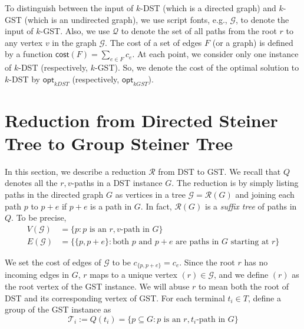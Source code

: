 \documentclass[11pt]{article}
\theoremstyle{definition}
\theoremstyle{remark}
\newcommand{\opt}{\mathsf{opt}}
\newcommand{\calG}{\mathcal{G}}
\newcommand{\calT}{\mathcal{T}}
\newcommand{\calQ}{\mathcal{Q}}
\newcommand{\calR}{\mathcal{R}}
\newcommand{\cost}{\mathsf{cost}}
\begin{document}
To distinguish between the input of $k$-DST (which is a directed graph)
and $k$-GST (which is an undirected graph), we use script fonts, 
e.g., $\calG$, to denote the input of $k$-GST.
Also, we use $\calQ$ to denote the set of all paths from the root $r$
to any vertex $v$ in the graph $\calG$. 
The cost of a set of edges $F$ (or a graph) is defined by a function 
$\cost(F)=\sum_{e\in F}c_e$. 
At each point, we consider only one instance of $k$-DST 
(respectively, $k$-GST).
So, we denote the cost of the optimal solution to $k$-DST by 
$\opt_{kDST}$ (respectively, $\opt_{kGST}$).

\section{Reduction from Directed Steiner Tree to Group Steiner Tree}
\label{sec:DST-to-GST}

In this section, we describe a reduction $\calR$ from DST to GST.
We recall that $Q$ denotes all the $r,v$-paths in a DST instance $G$. 
The reduction is by simply listing paths in the directed graph $G$
as vertices in a tree $\calG=\calR(G)$ and
joining each path $p$ to $p+e$ if $p+e$ is a path in $G$. 
In fact, $\calR(G)$ is a {\em suffix tree} of paths in $Q$.
To be precise,
\begin{align*}
V(\calG) &= \{p : \mbox{$p$ is an $r,v$-path in $G$}\}\\
E(\calG) &= \{\{p,p+e\}: \mbox{both $p$ and $p+e$ are paths in $G$ starting at $r$}\}
\end{align*}

We set the cost of edges of $\calG$ to be $c_{\{p,p+e\}}=c_e$.
Since the root $r$ has no incoming edges in $G$,
$r$ maps to a unique vertex $(r) \in \calG$, and we define $(r)$ as
the root vertex of the GST instance.
We will abuse $r$ to mean both the root of DST and 
its corresponding vertex of GST. 
For each terminal $t_i\in T$, define a group of the GST instance as
\[
\calT_i := Q(t_i) = \{p \subseteq G: \mbox{$p$ is an $r,t_i$-path in $G$}\}
\]
\end{document}
